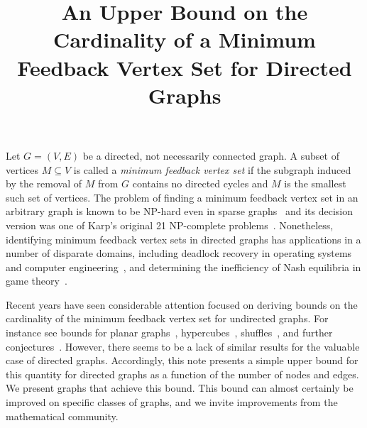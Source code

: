 \documentclass[CRMATH,Unicode,manuscript]{cedram}
\title{An Upper Bound on the Cardinality of a Minimum Feedback Vertex Set for Directed Graphs}
\author{\firstname{Philip} \middlename{N.} \lastname{Brown}\CDRorcid{0000-0003-3953-0503}}
\begin{document}
\maketitle





Let $G=(V,E)$ be a directed, not necessarily connected graph.
A subset of vertices $M\subseteq V$ is called a \emph{minimum feedback vertex set} if the subgraph induced by the removal of $M$ from $G$ contains no directed cycles and $M$ is the smallest such set of vertices.
The problem of finding a minimum feedback vertex set in an arbitrary graph is known to be NP-hard even in sparse graphs~\cite{Fomin2006,Borradaile2019} and its decision version was one of Karp's original 21 NP-complete problems~\cite{Karp1972}.
Nonetheless, identifying minimum feedback vertex sets in directed graphs has applications in a number of disparate domains, including deadlock recovery in operating systems and computer engineering~\cite{Lin2000}, and determining the inefficiency of Nash equilibria in game theory~\cite{Brown2019c}.


Recent years have seen considerable attention focused on deriving bounds on the cardinality of the minimum feedback vertex set for undirected graphs. For instance see bounds for planar graphs~\cite{Kelly2017}, hypercubes~\cite{Madelaine2008}, shuffles~\cite{Kralovic2003}, and further conjectures~\cite{Kowalik2010}.
However, there seems to be a lack of similar results for the valuable case of directed graphs.
Accordingly, this note presents a simple upper bound for this quantity for directed graphs as a function of the number of nodes and edges.
We present graphs that achieve this bound.
This bound can almost certainly be improved on specific classes of graphs, and we invite improvements from the mathematical community.
\end{document}
